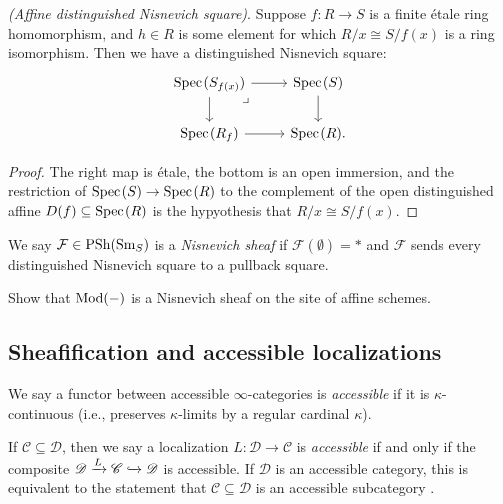 \documentclass[11pt,openany]{book}
\renewcommand{\Pre}{\mathrm{PSh}}
\begin{document}
\begin{example}\label{ex:affine-distinguished-nisnevich-square} \textit{(Affine distinguished Nisnevich square)}. Suppose $f: R \to S$ is a finite \'etale ring homomorphism, and $h\in R$ is some element for which $R/x \cong S/f(x)$ is a ring isomorphism. Then we have a distinguished Nisnevich square:
\[ \begin{tikzcd}
    \Spec(S_{f(x)})\rar\dar\pb & \Spec(S)\dar\\
    \Spec(R_f)\rar & \Spec(R).
\end{tikzcd} \]
\end{example}
\begin{proof} The right map is \'etale, the bottom is an open immersion, and the restriction of $\text{Spec}\hspace{0.1em}(S) \to \text{Spec}\hspace{0.1em}(R)$ to the complement of the open distinguished affine $D(f) \subseteq \text{Spec}\hspace{0.1em}(R)$ is the hypyothesis that $R/x \cong S/f(x)$.
\end{proof}

\begin{definition} We say $\mathcal{F} \in \Pre(\Sm_S)$ is a \textit{Nisnevich sheaf} if $\mathcal{F}(\emptyset)= \ast$ and $\mathcal{F}$ sends every distinguished Nisnevich square to a pullback square.
\end{definition}

\begin{exercise} Show that $\mathrm{Mod}(-)$ is a Nisnevich sheaf on the site of affine schemes.
\end{exercise}



\subsection{Sheafification and accessible localizations}

\begin{definition} \cite[5.4.2.5]{HTT} We say a functor between accessible $\infty$-categories is \textit{accessible} if it is $\kappa$-continuous (i.e., preserves $\kappa$-limits by a regular cardinal $\kappa$).
\end{definition}

\begin{definition} If $\mathscr{C} \subseteq \mathscr{D}$, then we say a localization $L \colon \mathscr{D} \to \mathscr{C}$ is \textit{accessible} if and only if the composite $\mathscr{D} \xrightarrow{L} \mathscr{C} \xhookrightarrow{} \mathscr{D}$ is accessible. If $\mathscr{D}$ is an accessible category, this is equivalent to the statement that $\mathscr{C} \subseteq \mathscr{D}$ is an accessible subcategory \cite[5.5.4.2]{HTT}.
\end{definition}
\end{document}

